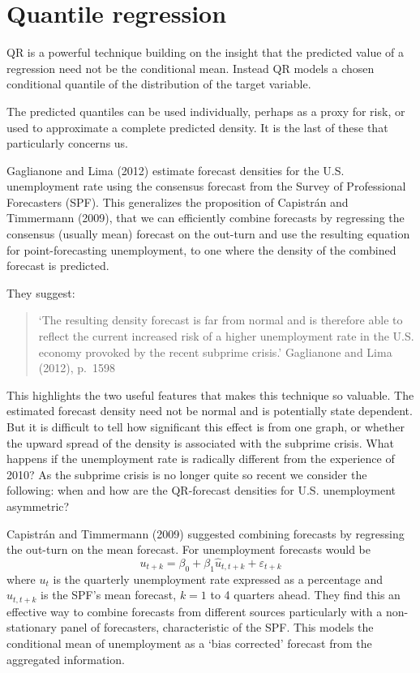 \documentclass[
  letterpaper,
]{book}
\begin{document}
\hypertarget{quantile-regression}{%
\section{Quantile regression}\label{quantile-regression}}

QR is a powerful technique building on the insight that the predicted
value of a regression need not be the conditional mean. Instead QR
models a chosen conditional quantile of the distribution of the target
variable.

The predicted quantiles can be used individually, perhaps as a proxy for
risk, or used to approximate a complete predicted density. It is the
last of these that particularly concerns us.

Gaglianone and Lima (2012) estimate forecast densities for the U.S.
unemployment rate using the consensus forecast from the Survey of
Professional Forecasters (SPF). This generalizes the proposition of
Capistrán and Timmermann (2009), that we can efficiently combine
forecasts by regressing the consensus (usually mean) forecast on the
out-turn and use the resulting equation for point-forecasting
unemployment, to one where the density of the combined forecast is
predicted.

They suggest:

\begin{quote}
`The resulting density forecast is far from normal and is therefore able
to reflect the current increased risk of a higher unemployment rate in
the U.S. economy provoked by the recent subprime crisis.' Gaglianone and
Lima (2012), p.~1598
\end{quote}

This highlights the two useful features that makes this technique so
valuable. The estimated forecast density need not be normal and is
potentially state dependent. But it is difficult to tell how significant
this effect is from one graph, or whether the upward spread of the
density is associated with the subprime crisis. What happens if the
unemployment rate is radically different from the experience of 2010? As
the subprime crisis is no longer quite so recent we consider the
following: when and how are the QR-forecast densities for U.S.
unemployment asymmetric?

Capistrán and Timmermann (2009) suggested combining forecasts by
regressing the out-turn on the mean forecast. For unemployment forecasts
would be \[
   u_{t+k} = \beta_0+\beta_1 \hat u_{t,t+k}+\varepsilon_{t+k} 
\] where \(u_t\) is the quarterly unemployment rate expressed as a
percentage and \(\hat u_{t,t+k}\) is the SPF's mean forecast, \(k = 1\)
to 4 quarters ahead. They find this an effective way to combine
forecasts from different sources particularly with a non-stationary
panel of forecasters, characteristic of the SPF. This models the
conditional mean of unemployment as a `bias corrected' forecast from the
aggregated information.
\end{document}
